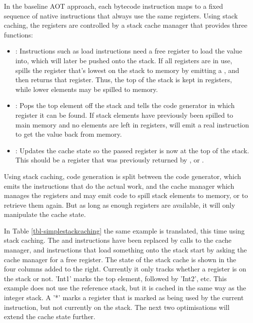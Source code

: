 In the baseline AOT approach, each bytecode instruction maps to a fixed sequence of native instructions that always use the same registers. Using stack caching, the registers are controlled by a stack cache manager that provides three functions:
\begin{itemize}
    \item {}: Instructions such as load instructions need a free register to load the value into, which will later be pushed onto the stack. If all registers are in use,  spills the register that's lowest on the stack to memory by emitting a , and then returns that register. Thus, the top of the stack is kept in registers, while lower elements may be spilled to memory.
    \item {}: Pops the top element off the stack and tells the code generator in which register it can be found. If stack elements have previously been spilled to main memory and no  elements are left in registers,  will emit a real  instruction to get the value back from memory.
    \item {}: Updates the cache state so the passed register is now at the top of the stack. This should be a register that was previously returned by , or .
\end{itemize}

Using stack caching, code generation is split between the code generator, which emits the instructions that do the actual work, and the cache manager which manages the registers and may emit code to spill stack elements to memory, or to retrieve them again. But as long as enough registers are available, it will only manipulate the cache state.

In Table \ref{tbl-simplestackcaching} the same example is translated, this time using stack caching. The  and  instructions have been replaced by calls to the cache manager, and instructions that load something onto the stack start by asking the cache manager for a free register. The state of the stack cache is shown in the four columns added to the right. Currently it only tracks whether a register is on the stack or not. 'Int1' marks the top element, followed by 'Int2', etc. This example does not use the reference stack, but it is cached in the same way as the integer stack. A '*' marks a register that is marked as being used by the current instruction, but not currently on the stack. The next two optimisations will extend the cache state further.
 
